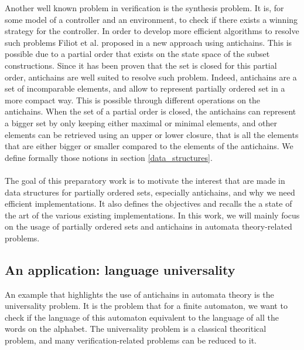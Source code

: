 \documentclass[letterpaper]{article}
\theoremstyle{definition}
\begin{document}
Another well known problem in verification is the synthesis problem.
It is, for
some model of a controller and an environment,
to check if there exists a winning strategy for the controller.
In order to develop more efficient algorithms to resolve such
problems Filiot et al. proposed in \cite{ltl_rea} a new approach
using antichains.
This is possible due to a partial order that exists on the state
space of the subset constructions. Since it has been
proven that the set is closed for this partial order,
antichains are well suited to resolve such problem.
Indeed, antichains are a set of incomparable elements, and
allow to represent partially ordered set in a more compact way.
This is possible through different operations on the antichains.
When the set of a partial order is closed, the antichains
can represent a bigger set by only keeping
either maximal or minimal elements,
and other elements can be retrieved using an upper or lower closure,
that is all the elements that are either bigger or smaller
compared to the elements of the antichains.
We define formally
those notions in section \ref{data_structures}.

\paragraph{}

The goal of this preparatory work is to motivate the interest that
are made in data structures for partially ordered sets,
especially antichains,
and why we need efficient
implementations.
It also defines the objectives
and recalls the a state of the art of the various existing implementations.
In this work, we will mainly focus
on the usage of partially ordered sets and antichains in
automata theory-related problems.

\subsection{An application: language universality}

An example that highlights the use of antichains in automata theory is
the universality problem.
It is the problem that for a finite automaton, we want to
check if the language of this automaton equivalent to the language
of all the words on the alphabet. The universality problem is a classical
theoritical problem, and many verification-related problems can be
reduced to it.

\paragraph{}
\end{document}
